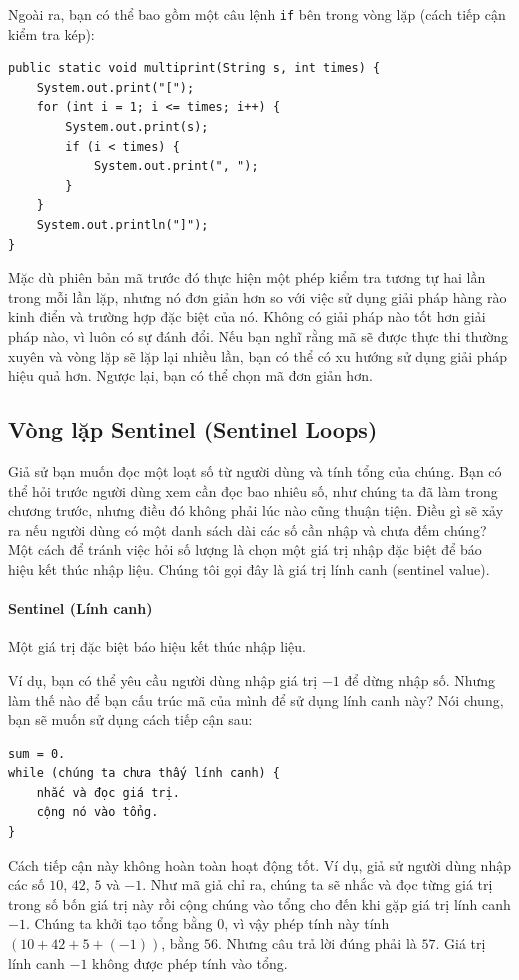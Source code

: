 Ngoài ra, bạn có thể bao gồm một câu lệnh \texttt{if} bên trong vòng lặp (cách tiếp cận kiểm tra kép):

\begin{verbatim}
public static void multiprint(String s, int times) {
    System.out.print("[");
    for (int i = 1; i <= times; i++) {
        System.out.print(s);
        if (i < times) {
            System.out.print(", ");
        }
    }
    System.out.println("]");
}
\end{verbatim}


Mặc dù phiên bản mã trước đó thực hiện một phép kiểm tra tương tự hai lần trong mỗi lần lặp, nhưng nó đơn giản hơn so với việc sử dụng giải pháp hàng rào kinh điển và trường hợp đặc biệt của nó. Không có giải pháp nào tốt hơn giải pháp nào, vì luôn có sự đánh đổi. Nếu bạn nghĩ rằng mã sẽ được thực thi thường xuyên và vòng lặp sẽ lặp lại nhiều lần, bạn có thể có xu hướng sử dụng giải pháp hiệu quả hơn. Ngược lại, bạn có thể chọn mã đơn giản hơn.

\subsection*{Vòng lặp Sentinel (Sentinel Loops)}

Giả sử bạn muốn đọc một loạt số từ người dùng và tính tổng của chúng. Bạn có thể hỏi trước người dùng xem cần đọc bao nhiêu số, như chúng ta đã làm trong chương trước, nhưng điều đó không phải lúc nào cũng thuận tiện. Điều gì sẽ xảy ra nếu người dùng có một danh sách dài các số cần nhập và chưa đếm chúng? Một cách để tránh việc hỏi số lượng là chọn một giá trị nhập đặc biệt để báo hiệu kết thúc nhập liệu. Chúng tôi gọi đây là giá trị lính canh (sentinel value).

\paragraph{Sentinel (Lính canh)}
Một giá trị đặc biệt báo hiệu kết thúc nhập liệu.

Ví dụ, bạn có thể yêu cầu người dùng nhập giá trị $-1$ để dừng nhập số. Nhưng làm thế nào để bạn cấu trúc mã của mình để sử dụng lính canh này? Nói chung, bạn sẽ muốn sử dụng cách tiếp cận sau:

\begin{verbatim}
sum = 0.
while (chúng ta chưa thấy lính canh) {
    nhắc và đọc giá trị.
    cộng nó vào tổng.
}
\end{verbatim}


Cách tiếp cận này không hoàn toàn hoạt động tốt. Ví dụ, giả sử người dùng nhập các số $10$, $42$, $5$ và $-1$. Như mã giả chỉ ra, chúng ta sẽ nhắc và đọc từng giá trị trong số bốn giá trị này rồi cộng chúng vào tổng cho đến khi gặp giá trị lính canh $-1$. Chúng ta khởi tạo tổng bằng $0$, vì vậy phép tính này tính $(10 + 42 + 5 + (-1))$, bằng $56$. Nhưng câu trả lời đúng phải là $57$. Giá trị lính canh $-1$ không được phép tính vào tổng.

